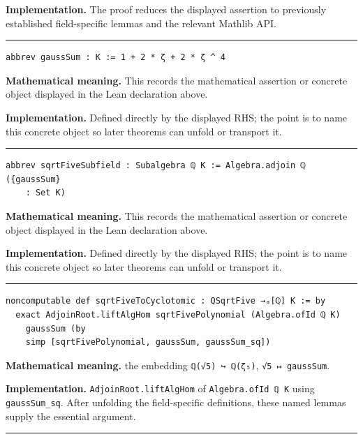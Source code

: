 \documentclass[UTF8,a4paper,11pt,fontset=fandol]{ctexart}
\theoremstyle{definition}
\newcommand{\statementsep}{\par\medskip\hrule\medskip}
\begin{document}
\noindent\textbf{Implementation.} The proof reduces the displayed assertion to previously established field-specific lemmas and the relevant Mathlib API.\par
\statementsep
\begin{verbatim}
abbrev gaussSum : K := 1 + 2 * ζ + 2 * ζ ^ 4
\end{verbatim}
\noindent\textbf{Mathematical meaning.} This records the mathematical assertion or concrete object displayed in the Lean declaration above.\par
\noindent\textbf{Implementation.} Defined directly by the displayed RHS; the point is to name this concrete object so later theorems can unfold or transport it.\par
\statementsep
\begin{verbatim}
abbrev sqrtFiveSubfield : Subalgebra ℚ K := Algebra.adjoin ℚ ({gaussSum}
    : Set K)
\end{verbatim}
\noindent\textbf{Mathematical meaning.} This records the mathematical assertion or concrete object displayed in the Lean declaration above.\par
\noindent\textbf{Implementation.} Defined directly by the displayed RHS; the point is to name this concrete object so later theorems can unfold or transport it.\par
\statementsep
\begin{verbatim}
noncomputable def sqrtFiveToCyclotomic : QSqrtFive →ₐ[ℚ] K := by
  exact AdjoinRoot.liftAlgHom sqrtFivePolynomial (Algebra.ofId ℚ K)
    gaussSum (by
    simp [sqrtFivePolynomial, gaussSum, gaussSum_sq])
\end{verbatim}
\noindent\textbf{Mathematical meaning.} the embedding \texttt{ℚ(√5) ↪ ℚ(ζ₅)}, \texttt{√5 ↦ gaussSum}.\par
\noindent\textbf{Implementation.} \texttt{AdjoinRoot.\allowbreak{}liftAlgHom} of \texttt{Algebra.\allowbreak{}ofId ℚ K} using \texttt{gaussSum\_\allowbreak{}sq}. After unfolding the field-specific definitions, these named lemmas supply the essential argument.\par
\statementsep
\end{document}
